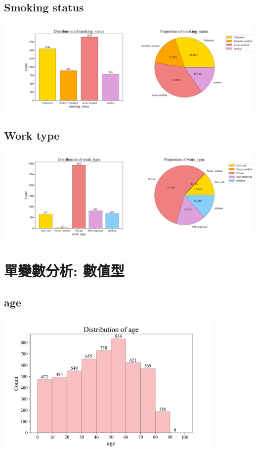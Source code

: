 \subsection{Smoking status}
\includegraphics[width=13.5cm]{./images/smoking_bar_pie.png}

\subsection{Work type}
\includegraphics[width=13.5cm]{./images/worktype_bar_pie.png}

\section{單變數分析: 數值型}
\subsection{age}
\includegraphics[height=7cm]{./images/age_distribution.png}

